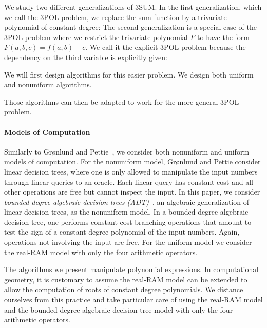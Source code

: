 We study two different generalizations of 3SUM\@. In the first generalization,
which we call the 3POL problem, we replace the sum function by a trivariate
polynomial of constant degree:
\ProblemPOLImplicit*
The second generalization is a special case of the 3POL problem where we
restrict the trivariate polynomial $F$ to have the form $F(a,b,c) = f(a,b) -
c$. We call it the explicit 3POL problem because the dependency on the third
variable is explicitly given:

We will first design algorithms for this easier problem.
We design both uniform and nonuniform algorithms.




Those algorithms can then be adapted to work for the more general 3POL
problem.




\paragraph{Models of Computation}

Similarly to Gr\o nlund and Pettie~\cite{GP18}, we consider both nonuniform
and uniform models of computation.
%
For the nonuniform model, Gr\o nlund and Pettie consider linear
decision trees, where one is only allowed to manipulate the input numbers
through linear queries to an oracle. Each linear query has constant cost and
all other operations are free but cannot inspect the input.
%
In this paper, we consider
\emph{bounded-degree algebraic decision trees (ADT)}~\cite{R72,Y81,SY82},
an algebraic generalization of linear decision trees,
as the nonuniform model. In a bounded-degree algebraic decision tree, one
performs constant cost branching operations that amount to test the sign of
a constant-degree polynomial of the input numbers. Again,
operations not involving the input are free.
%
For the uniform model we consider the real-RAM model with only the four
arithmetic operators.

The algorithms we present manipulate polynomial expressions.
%
In computational geometry, it is customary to assume the real-RAM model can be
extended to allow the computation of roots of constant degree polynomials.
We distance ourselves from this practice and take particular care
of using the real-RAM model and the bounded-degree algebraic decision tree
model with only the four arithmetic operators.

